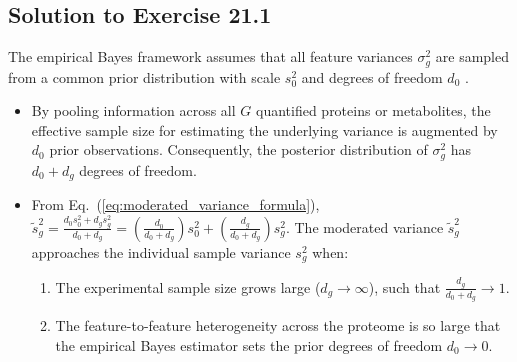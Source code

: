 \documentclass[11pt,twoside,openright]{book}
\begin{document}
\subsection*{Solution to Exercise 21.1}
The empirical Bayes framework assumes that all feature variances $\sigma_g^2$ are sampled from a common prior distribution with scale $s_0^2$ and degrees of freedom $d_0$ \cite{smyth2004linear}. 
\begin{itemize}
    \item By pooling information across all $G$ quantified proteins or metabolites, the effective sample size for estimating the underlying variance is augmented by $d_0$ prior observations. Consequently, the posterior distribution of $\sigma_g^2$ has $d_0 + d_g$ degrees of freedom.
    \item From Eq.~(\ref{eq:moderated_variance_formula}), $\tilde{s}_g^2 = \frac{d_0 s_0^2 + d_g s_g^2}{d_0 + d_g} = \left(\frac{d_0}{d_0 + d_g}\right) s_0^2 + \left(\frac{d_g}{d_0 + d_g}\right) s_g^2$. The moderated variance $\tilde{s}_g^2$ approaches the individual sample variance $s_g^2$ when:
    \begin{enumerate}
        \item The experimental sample size grows large ($d_g \to \infty$), such that $\frac{d_g}{d_0 + d_g} \to 1$.
        \item The feature-to-feature heterogeneity across the proteome is so large that the empirical Bayes estimator sets the prior degrees of freedom $d_0 \to 0$.
    \end{enumerate}
\end{itemize}
\end{document}
